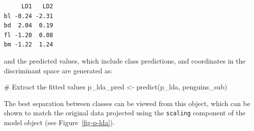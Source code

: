 \documentclass[
  letterpaper,
]{krantz}
\newenvironment{Shaded}{\begin{snugshade}}{\end{snugshade}}
\newcommand{\CommentTok}[1]{\textcolor[rgb]{0.37,0.37,0.37}{#1}}
\newcommand{\FunctionTok}[1]{\textcolor[rgb]{0.28,0.35,0.67}{#1}}
\newcommand{\NormalTok}[1]{\textcolor[rgb]{0.00,0.23,0.31}{#1}}
\newcommand{\OtherTok}[1]{\textcolor[rgb]{0.00,0.23,0.31}{#1}}
\begin{document}
\begin{verbatim}
     LD1   LD2
bl -0.24 -2.31
bd  2.04  0.19
fl -1.20  0.08
bm -1.22  1.24
\end{verbatim}

and the predicted values, which include class predictions, and
coordinates in the discriminant space are generated as:

\begin{Shaded}
\begin{Highlighting}[]
\CommentTok{\# Extract the fitted values}
\NormalTok{p\_lda\_pred }\OtherTok{\textless{}{-}} \FunctionTok{predict}\NormalTok{(p\_lda, penguins\_sub)}
\end{Highlighting}
\end{Shaded}

The best separation between classes can be viewed from this object,
which can be shown to match the original data projected using the
\texttt{scaling} component of the model object (see
Figure~\ref{fig-p-lda}).
\end{document}
